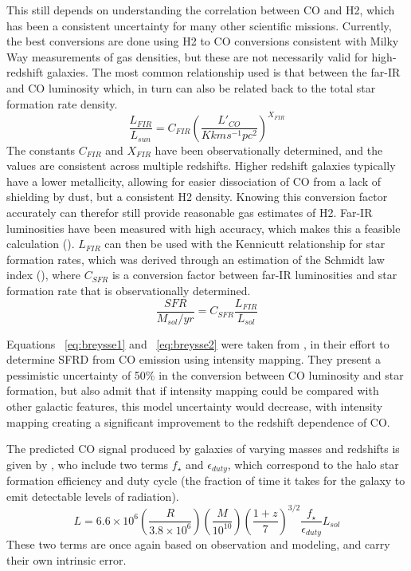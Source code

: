 \documentclass[manuscript]{aastex}
\begin{document}
This still depends on understanding the correlation between CO and H2, which has been a consistent uncertainty for many other scientific missions. Currently, the best conversions are done using H2 to CO conversions consistent with Milky Way measurements of gas densities, but these are not necessarily valid for high-redshift galaxies. The most common relationship used is that between the far-IR and CO luminosity which, in turn can also be related back to the total star formation rate density. 
\begin{equation}\label{eq:breysse1}
\frac{L_{FIR}}{L_{sun}} = C_{FIR}(\frac{L'_{CO}}{K km s^{-1} pc^{2}})^{X_{FIR}}
\end{equation}
The constants $C_{FIR}$ and $X_{FIR}$ have been observationally determined, and the values are consistent across multiple redshifts. Higher redshift galaxies typically have a lower metallicity, allowing for easier dissociation of CO from a lack of shielding by dust, but a consistent H2 density. Knowing this conversion factor accurately can therefor still provide reasonable gas estimates of H2.  Far-IR luminosities have been measured with high accuracy, which makes this a feasible calculation (\cite{Carilli2013}).  $L_{FIR}$ can then be used with the Kennicutt relationship for star formation rates, which was derived through an estimation of the Schmidt law index (\cite{Kennicutt1998}), where $C_{SFR}$ is a conversion factor between far-IR luminosities and star formation rate that is observationally determined. 
\begin{equation}\label{eq:breysse2}
\frac{SFR}{M_{sol}/yr} = C_{SFR}\frac{L_{FIR}}{L_{sol}}
\end{equation}

Equations ~\ref{eq:breysse1} and ~\ref{eq:breysse2} were taken from \cite{Breysse2016}, in their effort to determine SFRD from CO emission using intensity mapping.  They present a pessimistic uncertainty of 50\% in the conversion between CO luminosity and star formation, but also admit that if intensity mapping could be compared with other galactic features, this model uncertainty would decrease, with intensity mapping creating a significant improvement to the redshift dependence of CO.  

The predicted CO signal produced by galaxies of varying masses and redshifts is given by \cite{Visbal2010}, who include two terms  $f_{\star}$ and $\epsilon_{duty}$, which correspond to the halo star formation efficiency and 
duty cycle (the fraction of time it takes for the galaxy to emit detectable levels of radiation). 
\begin{equation}
L = 6.6\times10^{6}(\frac{R}{3.8\times10^{6}})(\frac{M}{10^{10}})(\frac{1+z}{7})^{3/2} \frac{f_{\star}}{\epsilon_{duty}} L_{sol}
\end{equation}
These two terms are once again based on observation and modeling, and carry their own intrinsic error. 
\end{document}
